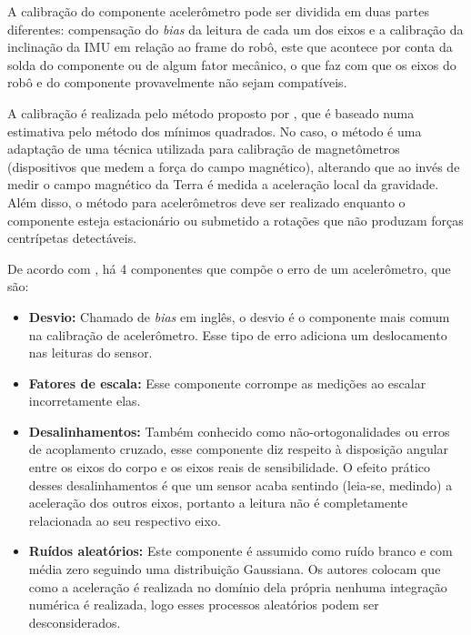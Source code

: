 \documentclass[acronym, symbols, table, deposito]{fei}
\begin{document}
			A calibração do componente acelerômetro pode ser dividida em duas partes diferentes: compensação do \textit{bias} da leitura de cada um dos eixos e a calibração da inclinação da IMU em relação ao frame do robô, este que acontece por conta da solda do componente ou de algum fator mecânico, o que faz com que os eixos do robô e do componente provavelmente não sejam compatíveis.
			
			A calibração é realizada pelo método proposto por \textcite{menezes2020triaxial}, que é baseado numa estimativa pelo método dos mínimos quadrados. No caso, o método é uma adaptação de uma técnica utilizada para calibração de magnetômetros (dispositivos que medem a força do campo magnético), alterando que ao invés de medir o campo magnético da Terra é medida a aceleração local da gravidade. Além disso, o método para acelerômetros deve ser realizado enquanto o componente esteja estacionário ou submetido a rotações que não produzam forças centrípetas detectáveis.
			
			De acordo com \textcite{menezes2020triaxial}, há 4 componentes que compõe o erro de um acelerômetro, que são:
			
			\begin{itemize}
				\item \textbf{Desvio:} Chamado de \textit{bias} em inglês, o desvio é o componente mais comum na calibração de acelerômetro. Esse tipo de erro adiciona um deslocamento nas leituras do sensor.
				
				\item \textbf{Fatores de escala:} Esse componente corrompe as medições ao escalar incorretamente elas.
				
				\item \textbf{Desalinhamentos:} Também conhecido como não-ortogonalidades ou erros de acoplamento cruzado, esse componente diz respeito à disposição angular entre os eixos do corpo e os eixos reais de sensibilidade. O efeito prático desses desalinhamentos é que um sensor acaba sentindo (leia-se, medindo) a aceleração dos outros eixos, portanto a leitura não é completamente relacionada ao seu respectivo eixo.
				
				\item \textbf{Ruídos aleatórios:} Este componente é assumido como ruído branco e com média zero seguindo uma distribuição Gaussiana. Os autores colocam que como a aceleração é realizada no domínio dela própria nenhuma integração numérica é realizada, logo esses processos aleatórios podem ser desconsiderados.
			\end{itemize}
			
\end{document}
